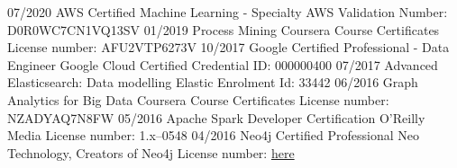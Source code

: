 \documentclass[]{../../../../friggeri-cv}
\begin{document}
\begin{entrylist2}
    \entrytwo
        {\small 07/2020}
        {\small AWS Certified Machine Learning - Specialty}
        {\small AWS}
        {\small Validation Number: D0R0WC7CN1VQ13SV}
    \entrytwo
        {\small 01/2019}
        {\small Process Mining}
        {\small Coursera Course Certificates}
        {\small License number: AFU2VTP6273V}
    \entrytwo
        {\small 10/2017}
        {\small Google Certified Professional - Data Engineer}
        {\small Google Cloud Certified}
        {\small Credential ID: 000000400}
    \entrytwo
        {\small 07/2017}
        {\small Advanced Elasticsearch: Data modelling}
        {\small Elastic}
        {\small Enrolment Id: 33442}
    \entrytwo
        {\small 06/2016}
        {\small Graph Analytics for Big Data}
        {\small Coursera Course Certificates}
        {\small License number: NZADYAQ7N8FW}
    \entrytwo
        {\small 05/2016}
        {\small Apache Spark Developer Certification}
        {\small O'Reilly Media}
        {\small License number: 1.x--0548}
    \entrytwo
        {\small 04/2016}
        {\small Neo4j Certified Professional}
        {\small Neo Technology, Creators of Neo4j}
        {\small License number: \href{https://drive.google.com/open?id=1ol67OnuuWBmrIeJPbvLNOOiQC8K0pXb_}{here}}
\end{entrylist2}
\end{document}

